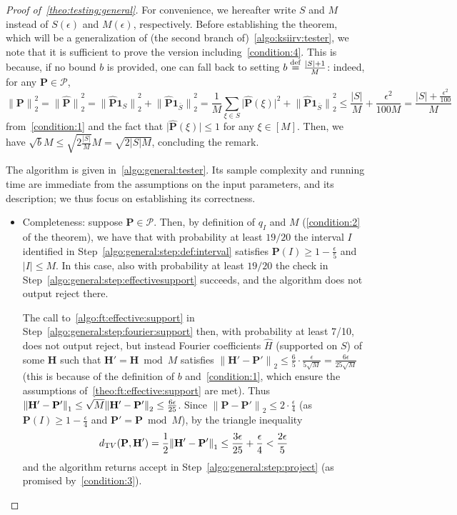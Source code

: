 \documentclass[11pt]{article}
\theoremstyle{definition}
\newcommand{\p}{\mathbf{P}}
\newcommand{\h}{\mathbf{H}}
\newcommand{\dtv}{d_{\mathrm TV}}
\newcommand{\eps}{\epsilon}
\newcommand{\abs}[1]{\lvert#1\rvert}
\newcommand{\norm}[1]{\lVert#1\rVert}
\newcommand{\eqdef}{\stackrel{{\mathrm {\footnotesize def}}}{=}}
\newcommand{\normtwo}[1]{{\norm{#1}}_2}
\renewcommand{\abs}[1]{\left\lvert #1 \right\rvert}
\newcommand{\dabs}[1]{\lvert #1 \rvert}
\newcommand{\accept}{\textsf{accept}\xspace}
\newcommand{\reject}{\textsf{reject}\xspace}
\newcommand{\fourier}[1]{\widehat{#1}}
\begin{document}
\begin{proof}[Proof of~\cref{theo:testing:general}]
  For convenience, we hereafter write $S$ and $M$ instead of $S(\eps)$ and $M(\eps)$, respectively. Before establishing the theorem, which will be a generalization of (the second branch of)~\cref{algo:ksiirv:tester}, we note that it is sufficient to prove the version including~\cref{condition:4}. This is because, if no bound $b$ is provided, one can fall back to setting $b\eqdef\frac{\abs{S}+1}{M}$: indeed, for any $\p\in\mathcal{P}$,
  \begin{equation}\label{eq:default:bound:l2:norm}
      \normtwo{\p}^2 = \normtwo{\fourier{\p}}^2 = \normtwo{\fourier{\p}\mathbf{1}_{S}}^2+\normtwo{\fourier{\p}\mathbf{1}_{\bar{S}}}^2
      = \frac{1}{M}\sum_{\xi\in S}\dabs{\fourier{\p}(\xi)}^2 + \normtwo{\fourier{\p}\mathbf{1}_{\bar{S}}}^2
      \leq \frac{\abs{S}}{M} + \frac{\eps^2}{100M} = \frac{\abs{S}+\frac{\eps^2}{100}}{M}
  \end{equation}
  from~\cref{condition:1} and the fact that $\dabs{\fourier{\p}(\xi)}\leq 1$ for any $\xi\in[M]$. Then, we have $\sqrt{b}M \leq \sqrt{2\frac{\abs{S}}{M}}M = \sqrt{2\abs{S}M}$, concluding the remark. 
  
  The algorithm is given in~\cref{algo:general:tester}. Its sample complexity and running time are immediate from the assumptions on the input parameters, and its description; we thus focus on establishing its correctness.
  
  \begin{itemize}
      \item Completeness: suppose $\p\in\mathcal{P}$. Then, by definition of $q_I$ and $M$ (\cref{condition:2} of the theorem), we have that with probability at least $19/20$ the interval $I$ identified in Step~\ref{algo:general:step:def:interval} satisfies $\p(I)\geq 1-\frac{\eps}{5}$ and $\abs{I}\leq M$. In this case, also with probability at least $19/20$ the check in Step~\ref{algo:general:step:effectivesupport} succeeds, and the algorithm does not output \reject there.
      
      The call to~\cref{algo:ft:effective:support} in Step~\ref{algo:general:step:fourier:support} then, with probability at least 7/10, does not output \reject, but instead Fourier coefficients $\fourier{H}$ (supported on $S$) of some $\h$ such that $\h'=\h \bmod M$ satisfies $\normtwo{\h'-\p'} \leq \frac{6}{5}\cdot \frac{\eps}{5\sqrt{M}} = \frac{6\eps}{25\sqrt{M}}$ (this is because of the definition of $b$ and~\cref{condition:1}, which ensure the assumptions of~\cref{theo:ft:effective:support} are met). Thus $\normone{\h'-\p'} \leq \sqrt{M}\normtwo{\h'-\p'} \leq \frac{6\eps}{25}$. Since $\normtwo{\p-\p'} \leq 2\cdot\frac{\eps}{4}$ (as $\p(I)\geq 1-\frac{\eps}{4}$ and $\p'=\p\bmod M$), by the triangle inequality
      \[
        \dtv(\p,\h') = \frac{1}{2}\normone{\h'-\p'} \leq \frac{3\eps}{25}+\frac{\eps}{4} < \frac{2\eps}{5}
      \]
      and the algorithm returns \accept in Step~\ref{algo:general:step:project} (as promised by~\cref{condition:3}).
      

\end{itemize}
\end{proof}
\end{document}
